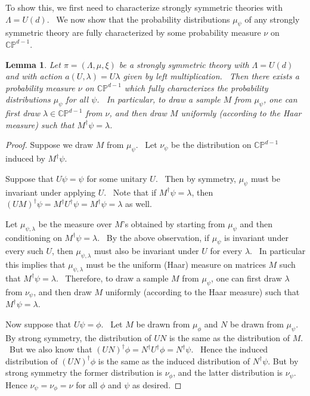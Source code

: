 \documentclass[letterpaper,12pt]{article}
\newtheorem{lem}{Lemma}
\begin{document}
To show this, we first need to characterize strongly symmetric theories with $\Lambda=U(d)$. \ We now show that the probability distributions $\mu_\psi$ of any strongly symmetric theory are fully characterized by some probability measure $\nu$ on $\mathbb{CP}^{d-1}$.


\begin{lem} Let $\pi=(\Lambda,\mu,\xi)$ be a strongly symmetric theory with $\Lambda=U(d)$ and with action $a(U, \lambda)=U\lambda$ given by left multiplication. \ Then there exists a probability measure $\nu$ on $\mathbb{CP}^{d-1}$ which fully characterizes the probability distributions $\mu_\psi$ for all $\psi$. \ In particular, to draw a sample $M$ from $\mu_\psi$, one can first draw $\lambda \in \mathbb{CP}^{d-1}$ from $\nu$, and then draw $M$ uniformly (according to the Haar measure) such that $M^\dagger \psi = \lambda$.
\label{lem:existence-nu}
\end{lem}


\begin{proof}
Suppose we draw $M$ from $\mu_\psi$. \ Let $\nu_\psi$ be the distribution on $\mathbb{CP}^{d-1}$ induced by $M^\dagger \psi$.

Suppose that $U\psi=\psi$ for some unitary $U$. \ Then by symmetry, $\mu_\psi$ must be invariant under applying $U$. \ Note that if $M^\dagger \psi= \lambda$, then $(UM)^\dagger \psi = M^\dagger U^\dagger \psi = M^\dagger \psi = \lambda$ as well.


Let $\mu_{\psi, \lambda}$ be the measure over $M$'s obtained by starting from $\mu_\psi$ and then conditioning on $M^\dagger \psi= \lambda$. \ By the above observation, if $\mu_\psi$ is invariant under every such $U$, then $\mu_{\psi, \lambda}$ must also be invariant under $U$ for every $\lambda$. \ In particular this implies that $\mu_{\psi, \lambda}$ must be the uniform (Haar) measure on matrices $M$ such that $M^\dagger \psi = \lambda$. \ Therefore, to draw a sample $M$ from $\mu_\psi$, one can first draw $\lambda$ from $\nu_\psi$, and then draw $M$ uniformly (according to the Haar measure) such that $M^\dagger \psi = \lambda$.

Now suppose that $U\psi=\phi$. \ Let $M$ be drawn from $\mu_\phi$ and $N$ be drawn from $\mu_\psi$. By strong symmetry, the distribution of $UN$ is the same as the distribution of $M$. \ But we also know that $(UN)^\dagger \phi = N^\dagger U^\dagger \phi = N^\dagger \psi$. \ Hence the induced distribution of $(UN)^\dagger \phi$ is the same as the induced distribution of $N^\dagger \psi$. But by strong symmetry the former distribution is $\nu_\phi$, and the latter distribution is $\nu_\psi$. Hence $\nu_\psi=\nu_\phi = \nu$ for all $\phi$ and $\psi$ as desired.


\end{proof}
\end{document}
